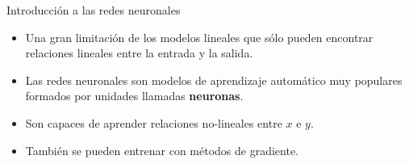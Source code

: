 \documentclass[handout]{beamer}
\begin{document}
%
 
 





\begin{frame}{Introducción a las redes neuronales}
\begin{scriptsize}
\begin{itemize}
\item Una gran limitación de los modelos lineales que sólo pueden encontrar relaciones lineales entre la entrada y la salida.
\item Las redes neuronales son modelos de aprendizaje automático muy populares formados por unidades llamadas \textbf{neuronas}.
\item Son capaces de aprender relaciones no-lineales entre $x$ e $y$.
\item También se pueden entrenar con métodos de gradiente.
\end{itemize}


\end{scriptsize}
\end{frame}
\end{document}
